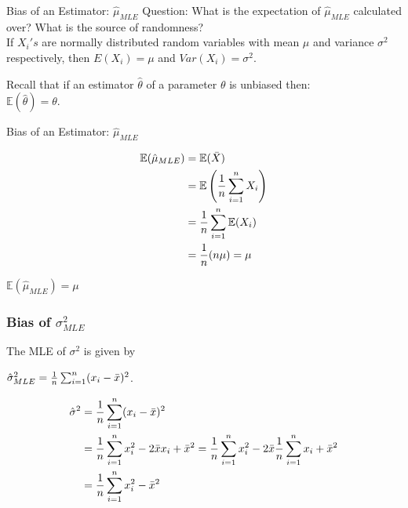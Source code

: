 \documentclass[handout]{beamer}
\begin{document}
    \begin{frame}{Bias of an Estimator: $\hat{\mu}_{MLE}$}
        \pause 
        Question: What is the expectation of $\hat{\mu}_{MLE}$ calculated over? What is the source of randomness? \\
        If $X_i's$ are normally distributed random variables with mean $\mu$ and variance $\sigma^2 $ respectively, then $E(X_i) = \mu$ and $Var(X_i)=\sigma^2.$

        Recall that if an estimator $\hat{\theta}$ of a parameter $\theta$ is unbiased then:\\
        $\mathbb{E}(\hat{\theta})=\theta.$
    
        
    \end{frame}
    
    \begin{frame}{Bias of an Estimator: $\hat{\mu}_{MLE}$}
        
        \begin{align*}
            \mathbb{E}(\hat{\mu}_{MLE}) &= \mathbb{E}(\Bar{X}) \\
            &=\mathbb{E}\left(\frac{1}{n}\sum_{i=1}^nX_i\right) \\
            &=\frac{1}{n}\sum_{i=1}^n\mathbb{E}(X_i) \\
            &=\frac{1}{n}(n\mu) = \mu
        \end{align*}
        
        
        \begin{tcolorbox}[colback=metropolisblue!5,colframe=metropolisblue,title= Estimator $\hat{\mu}_{MLE}$ is unbiased]
            $\mathbb{E}(\hat{\mu}_{MLE}) = \mu$
        \end{tcolorbox}

        
    \end{frame}

    \begin{frame}
        \frametitle{Bias of $\sigma^2_{MLE}$}
        
        The MLE of $\sigma^2$ is given by
        
        $\hat{\sigma}^2_{MLE} = \frac{1}{n} \sum_{i=1}^n (x_i-\Bar{x})^2$.
        
        \begin{align*}
            \hat{\sigma}^2 &= \frac{1}{n} \sum_{i=1}^n (x_i-\Bar{x})^2 \\
            &= \frac{1}{n} \sum_{i=1}^n x_i^2 - 2\Bar{x} x_i + \Bar{x}^2 = \frac{1}{n} \sum_{i=1}^n x_i^2  -2\Bar{x}\frac{1}{n}\sum_{i=1}^nx_i+ \Bar{x}^2 \\
            &= \frac{1}{n}\sum_{i=1}^nx_i^2 - \Bar{x}^2
            \end{align*}

        \end{frame}
\end{document}
